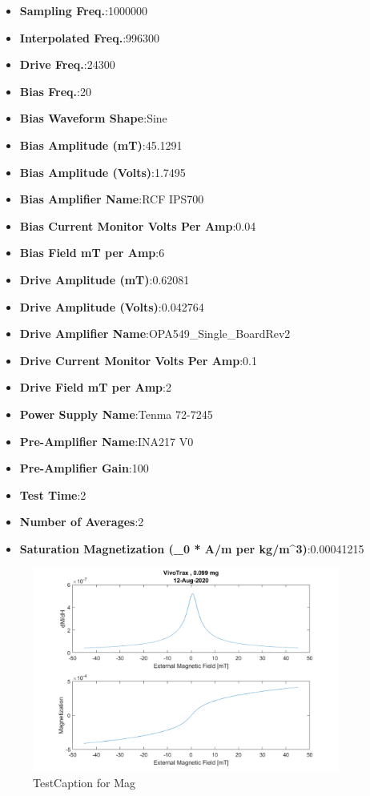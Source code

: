 \documentclass{article}
\begin{document}
\begin{itemize}	\item{\textbf{Sampling Freq.}:1000000}
	\item{\textbf{Interpolated Freq.}:996300}
	\item{\textbf{Drive Freq.}:24300}
	\item{\textbf{Bias Freq.}:20}
	\item{\textbf{Bias Waveform Shape}:Sine}
	\item{\textbf{Bias Amplitude (mT)}:45.1291}
	\item{\textbf{Bias Amplitude (Volts)}:1.7495}
	\item{\textbf{Bias Amplifier Name}:RCF IPS700}
	\item{\textbf{Bias Current Monitor Volts Per Amp}:0.04}
	\item{\textbf{Bias Field mT per Amp}:6}
	\item{\textbf{Drive Amplitude (mT)}:0.62081}
	\item{\textbf{Drive Amplitude (Volts)}:0.042764}
	\item{\textbf{Drive Amplifier Name}:OPA549_Single_BoardRev2}
	\item{\textbf{Drive Current Monitor Volts Per Amp}:0.1}
	\item{\textbf{Drive Field mT per Amp}:2}
	\item{\textbf{Power Supply Name}:Tenma 72-7245}
	\item{\textbf{Pre-Amplifier Name}:INA217 V0}
	\item{\textbf{Pre-Amplifier Gain}:100}
	\item{\textbf{Test Time}:2}
	\item{\textbf{Number of Averages}:2}
	\item{\textbf{Saturation Magnetization (\mu_0 * A/m per kg/m^3)}:0.00041215}
\end{itemize}
\begin{figure}[h] 
 \centering 
 \includegraphics[width=0.9\textwidth]{VivoTrax_12_Aug_2020_MagFig.png}
 \caption{TestCaption for Mag}
 \end{figure}
\end{document}

